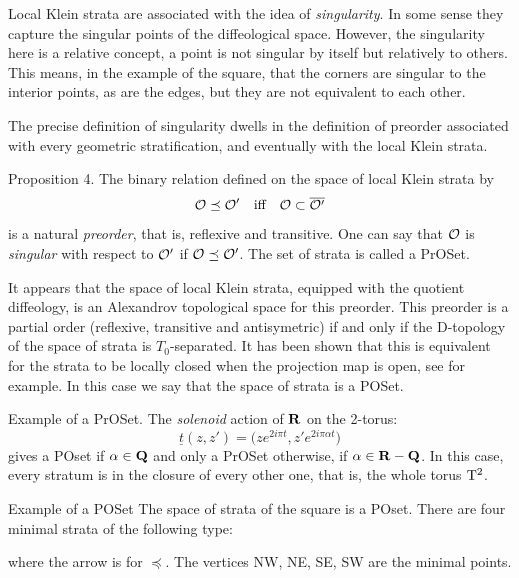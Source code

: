 Local Klein strata are associated with the idea of \emph{singularity}.
In some sense they capture the singular points of the diffeological space.
However,
the singularity here is a relative concept,
a point is not singular by itself but relatively to others.
This means,
in the example of the square,
that the corners are singular to the interior points,
as are the edges,
but they are not equivalent to each other.

The precise definition of singularity dwells in the definition of preorder associated with every geometric stratification,
and eventually with the local Klein strata.

\begin{Article}{Proposition 4.}{}
  The binary relation defined on the space of local Klein strata by
  $$
    \mathcal{O} \preceq \mathcal{O}' \quad \text{iff} \quad \mathcal{O} \subset \overline{\mathcal{O}'}
    $$
  is a natural \emph{preorder},
  that is,
  reflexive and transitive.
  One can say that $\mathcal{O}$ is \emph{singular} with respect to $\mathcal{O}'$ if $\mathcal{O} \preceq \mathcal{O}'$.
  The set of strata is called a PrOSet.
\end{Article}

It appears that the space of local Klein strata,
equipped with the quotient diffeology,
is an Alexandrov topological space for this preorder.
This preorder is a partial order (reflexive, transitive and antisymetric) if and only if the D-topology of the space of strata is $T_0$-separated.
It has been shown that this is equivalent for the strata to be locally closed when the projection map is open,
see \cite{SY19} for example.
In this case we say that the space of strata is a POSet.

\begin{Article}{Example of a PrOSet.}{}
  The \emph{solenoid} action of $\mathbf{R}$ on the 2-torus:
  $$
    \underline{t}(z,z') = \big(z e^{2i\pi t}, z' e^{2i\pi \alpha t}\big)
    $$
  gives a POset if $\alpha \in \mathbf{Q}$ and only a PrOSet otherwise,
  if $\alpha \in \mathbf{R} - \mathbf{Q}$.
  In this case, every stratum is in the closure of every other one,
  that is,
  the whole torus $\mathrm{T}^2$.
\end{Article}

\begin{Article}{Example of a POSet}{}
  The space of strata of the square is a POset.
  There are four minimal strata of the following type:
  
  \begin{center}
  \end{center}
  where the arrow is for $\preceq$.
  The vertices NW, NE, SE, SW are the minimal points.
\end{Article}

